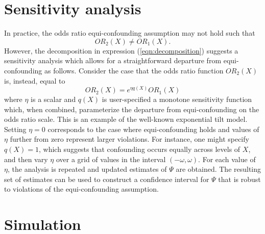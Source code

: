 \documentclass[11pt]{article}
\begin{document}
\section{Sensitivity analysis}
In practice, the odds ratio equi-confounding assumption may not hold such that
$$OR_2(X) \neq OR_1(X).$$ 
However, the decomposition in expression (\ref{eqn:decomposition}) suggests a sensitivity analysis which allows for a straightforward departure from equi-confounding as follows. Consider the case that the odds ratio function $OR_2(X)$ is, instead, equal to
$$ OR_2(X) = e^{\eta q(X)} OR_1(X) $$
where $\eta$ is a scalar and $q(X)$ is user-specified a monotone sensitivity function which, when combined, parameterize the departure from equi-confounding on the odds ratio scale. This is an example of the well-known exponential tilt model. Setting $\eta = 0$ corresponds to the case where equi-confounding holds and values of $\eta$ further from zero represent larger violations. For instance, one might specify $q(X) = 1$, which suggests that confounding occurs equally across levels of $X$, and then vary $\eta$ over a grid of values in the interval $(-\omega, \omega)$. For each value of $\eta$, the analysis is repeated and updated estimates of $\Psi$ are obtained. The resulting set of estimates can be used to construct a confidence interval for $\Psi$ that is robust to violations of the equi-confounding assumption.

\section{Simulation}
\end{document}
